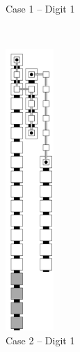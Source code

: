 \begin{itemize}
\begin{figure}[H]
\begin{subfigure}[t]{0.2\textwidth}
                    \caption{\label{fig:warping/digit_top_case1_digit1_msr} Case 1 -- Digit 1}
                \end{subfigure}%
                ~
                \begin{subfigure}[t]{0.2\textwidth}
                    \centering
                    \includegraphics[width=0.2\textwidth]{warping/digit_top_case2_digit1_msr}
                    \caption{\label{fig:warping/digit_top_case2_digit1_msr} Case 2 -- Digit 1}
                \end{subfigure}%
                ~
                \begin{subfigure}[t]{0.2\textwidth}
                    \centering

\end{subfigure}
\end{figure}
\end{itemize}
